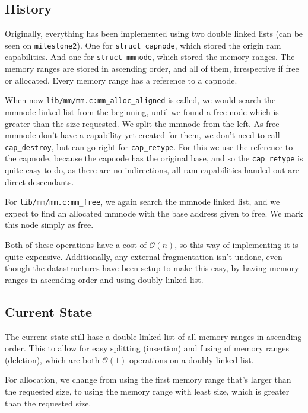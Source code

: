 \subsection{History}

Originally, everything has been implemented using two double linked lists (can
be seen on \verb|milestone2|).
One for \verb|struct capnode|, which stored the origin ram capabilities.
And one for \verb|struct mmnode|, which stored the memory ranges.
The memory ranges are stored in ascending order, and all of them, irrespective
if free or allocated.
Every memory range has a reference to a capnode.

When now \verb|lib/mm/mm.c:mm_alloc_aligned| is called, we would search the
mmnode linked list from the beginning, until we found a free node which is
greater than the size requested.
We split the mmnode from the left.
As free mmnode don't have a capability yet created for them, we don't need to
call \verb|cap_destroy|, but can go right for \verb|cap_retype|.
For this we use the reference to the capnode, because the capnode has the
original base, and so the \verb|cap_retype| is quite easy to do, as there are
no indirections, all ram capabilities handed out are direct descendants.

For \verb|lib/mm/mm.c:mm_free|, we again search the mmnode linked list, and we
expect to find an allocated mmnode with the base address given to free.
We mark this node simply as free.

Both of these operations have a cost of $\mathcal{O}(n)$, so this way of
implementing it is quite expensive.
Additionally, any external fragmentation isn't undone, even though the
datastructures have been setup to make this easy, by having memory ranges in
ascending order and using doubly linked list.

\subsection{Current State}

The current state still hase a double linked list of all memory ranges in
ascending order. This to allow for easy splitting (insertion) and fusing of
memory ranges (deletion), which are both $\mathcal{O}(1)$ operations on a doubly
linked list.

For allocation, we change from using the first memory range that's larger than
the requested size, to using the memory range with least size, which is greater
than the requested size.

